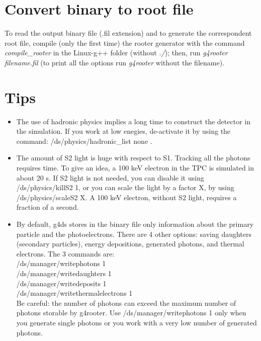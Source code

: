 \documentclass[twocolumn, 10pt]{article}
\begin{document}
\section{Convert binary to root file}
To read the output binary file (.fil extension) and to generate the correspondent root file, compile  (only the first time) the rooter generator with the command
\textit{compile\_rooter} in the Linux-g++ folder (without \textit{./}); then,  run \textit{g4rooter filename.fil} (to print all the options
run \textit{g4rooter} without the filename).

\section{Tips}
\begin{itemize}
\item The use of hadronic physics implies a long time to construct the detector in the simulation. If you work at low enegies,
de-activate it by using the command: /ds/physics/hadronic\_list none .
\item The amount of S2 light is huge with respect to S1. Tracking all the photons requires time. To give an idea, a 100 keV electron in
the TPC is simulated in about 20 s. If S2 light is not needed, you can disable it using /ds/physics/killS2 1, or you can scale the
light by a factor X, by using /ds/physics/scaleS2 X. A 100 keV electron, without S2 light, requires a fraction of a second. 
\item 
By default, g4ds stores in the binary file only information about the primary particle and the photoelectrons. There are 4 other options: saving daughters (secondary particles), energy depositions, generated photons, and thermal electrons. The 3 commands are:\\
/ds/manager/writephotons 1\\
/ds/manager/writedaughters 1\\
/ds/manager/writedeposits 1\\
/ds/manager/writethermalelectrons 1\\
Be careful: the number of photons can exceed the maximum number of photons storable by g4rooter. Use /ds/manager/writephotons 1 only when you generate single photons or you work with a very low number of generated photons. 

\end{itemize}
\end{document}
